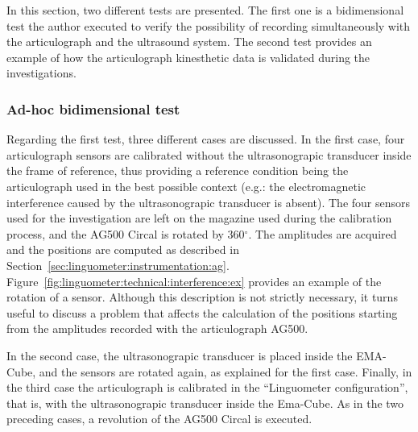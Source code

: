 

In this section, two different tests are presented. The first one is a
bidimensional test the author executed to verify the possibility of
recording  simultaneously with the articulograph and the ultrasound system.
The second test provides an example of how the articulograph kinesthetic data is
validated during the investigations.

\subsubsection{Ad-hoc bidimensional test}
Regarding the first test, three different cases are discussed.
In the first case, four articulograph sensors are calibrated without the 
ultrasonograpic transducer inside the frame of reference, thus
providing a reference condition being the articulograph used in the best
possible context (e.g.: the electromagnetic interference caused by the
ultrasonograpic transducer is absent).
The four sensors used for the investigation are left on the magazine used during
the calibration process, and the AG500 Circal is rotated by 360$^{\circ}$.
The amplitudes are acquired and the positions are computed as described in
Section~\ref{sec:linguometer:instrumentation:ag}.
Figure~\ref{fig:linguometer:technical:interference:ex} provides an example
of the rotation of a sensor.
Although this description is not strictly necessary, it turns useful to 
discuss a problem that affects the 
calculation of the positions starting from the amplitudes recorded with the
articulograph AG500.


In the second case, the ultrasonograpic transducer is placed inside the
EMA-Cube, and the sensors are rotated again, as explained for the first case.
Finally, in the third case the articulograph is calibrated in the ``Linguometer
configuration'', that is, with the ultrasonograpic transducer inside the
Ema-Cube.
As in the two preceding cases, a revolution of the AG500 Circal is executed.

